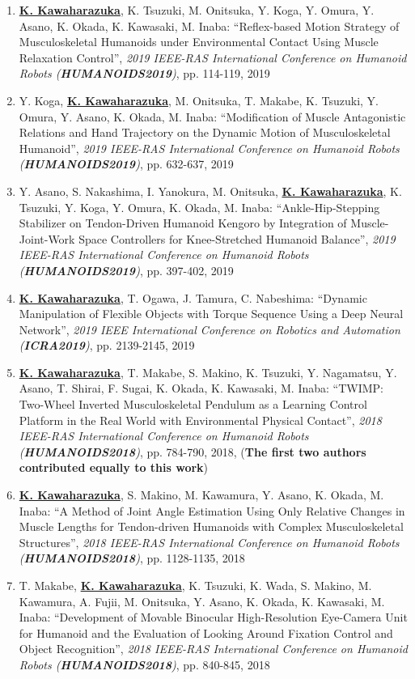 \documentclass[letterpaper]{article}
\begin{document}
\begin{enumerate}
\item \underline{\textbf{K. Kawaharazuka}}, K. Tsuzuki, M. Onitsuka, Y. Koga, Y. Omura, Y. Asano, K. Okada, K. Kawasaki, M. Inaba: ``Reflex-based Motion Strategy of Musculoskeletal Humanoids under Environmental Contact Using Muscle Relaxation Control'', \textit{2019 IEEE-RAS International Conference on Humanoid Robots (\textit{\textbf{HUMANOIDS2019}})}, pp. 114-119, 2019
\item Y. Koga, \underline{\textbf{K. Kawaharazuka}}, M. Onitsuka, T. Makabe, K. Tsuzuki, Y. Omura, Y. Asano, K. Okada, M. Inaba: ``Modification of Muscle Antagonistic Relations and Hand Trajectory on the Dynamic Motion of Musculoskeletal Humanoid'', \textit{2019 IEEE-RAS International Conference on Humanoid Robots (\textit{\textbf{HUMANOIDS2019}})}, pp. 632-637, 2019
\item Y. Asano, S. Nakashima, I. Yanokura, M. Onitsuka, \underline{\textbf{K. Kawaharazuka}}, K. Tsuzuki, Y. Koga, Y. Omura, K. Okada, M. Inaba: ``Ankle-Hip-Stepping Stabilizer on Tendon-Driven Humanoid Kengoro by Integration of Muscle-Joint-Work Space Controllers for Knee-Stretched Humanoid Balance'', \textit{2019 IEEE-RAS International Conference on Humanoid Robots (\textit{\textbf{HUMANOIDS2019}})}, pp. 397-402, 2019
\item \underline{\textbf{K. Kawaharazuka}}, T. Ogawa, J. Tamura, C. Nabeshima: ``Dynamic Manipulation of Flexible Objects with Torque Sequence Using a Deep Neural Network'', \textit{2019 IEEE International Conference on Robotics and Automation (\textit{\textbf{ICRA2019}})}, pp. 2139-2145, 2019
\item \underline{\textbf{K. Kawaharazuka}}, T. Makabe, S. Makino, K. Tsuzuki, Y. Nagamatsu, Y. Asano, T. Shirai, F. Sugai, K. Okada, K. Kawasaki, M. Inaba: ``TWIMP: Two-Wheel Inverted Musculoskeletal Pendulum as a Learning Control Platform in the Real World with Environmental Physical Contact'', \textit{2018 IEEE-RAS International Conference on Humanoid Robots (\textit{\textbf{HUMANOIDS2018}})}, pp. 784-790, 2018, (\textbf{The first two authors contributed equally to this work})
\item \underline{\textbf{K. Kawaharazuka}}, S. Makino, M. Kawamura, Y. Asano, K. Okada, M. Inaba: ``A Method of Joint Angle Estimation Using Only Relative Changes in Muscle Lengths for Tendon-driven Humanoids with Complex Musculoskeletal Structures'', \textit{2018 IEEE-RAS International Conference on Humanoid Robots (\textit{\textbf{HUMANOIDS2018}})}, pp. 1128-1135, 2018
\item T. Makabe, \underline{\textbf{K. Kawaharazuka}}, K. Tsuzuki, K. Wada, S. Makino, M. Kawamura, A. Fujii, M. Onitsuka, Y. Asano, K. Okada, K. Kawasaki, M. Inaba: ``Development of Movable Binocular High-Resolution Eye-Camera Unit for Humanoid and the Evaluation of Looking Around Fixation Control and Object Recognition'', \textit{2018 IEEE-RAS International Conference on Humanoid Robots (\textit{\textbf{HUMANOIDS2018}})}, pp. 840-845, 2018

\end{enumerate}
\end{document}
